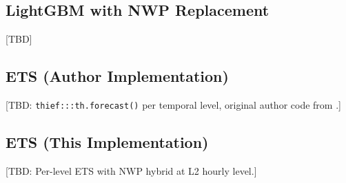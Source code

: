 \subsection{LightGBM with NWP Replacement}\label{sec:method-lgbm-nwp}
[TBD]

\subsection{ETS (Author Implementation)}\label{sec:method-ets-author}
[TBD: \texttt{thief:::th.forecast()} per temporal level, original author code from \citet{difonzo2023spatiotemporal}.]

\subsection{ETS (This Implementation)}\label{sec:method-ets}
[TBD: Per-level ETS with NWP hybrid at L2 hourly level.]
